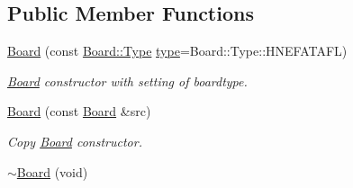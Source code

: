 \subsection*{Public Member Functions}
\begin{DoxyCompactItemize}
\item 
\hyperlink{class_board_af67811d3be762bf75ebe5b2dc4b3070e}{Board} (const \hyperlink{class_board_a7a90fdd0f301fc502684108416605644}{Board\-::\-Type} \hyperlink{class_board_a05a3dd8f1f000e20e743e894163228ec}{type}=Board\-::\-Type\-::\-H\-N\-E\-F\-A\-T\-A\-F\-L)
\begin{DoxyCompactList}\small\item\em \hyperlink{class_board}{Board} constructor with setting of boardtype. \end{DoxyCompactList}\item 
\hypertarget{class_board_a0830880c4f04fa4500e23d67dfec525d}{\hyperlink{class_board_a0830880c4f04fa4500e23d67dfec525d}{Board} (const \hyperlink{class_board}{Board} \&src)}\label{class_board_a0830880c4f04fa4500e23d67dfec525d}

\begin{DoxyCompactList}\small\item\em Copy \hyperlink{class_board}{Board} constructor. \end{DoxyCompactList}\item 
\hypertarget{class_board_a737c0ecdabeccd0460bcbae2f8ac6c44}{\hyperlink{class_board_a737c0ecdabeccd0460bcbae2f8ac6c44}{$\sim$\-Board} (void)}\label{class_board_a737c0ecdabeccd0460bcbae2f8ac6c44}


\end{DoxyCompactItemize}
